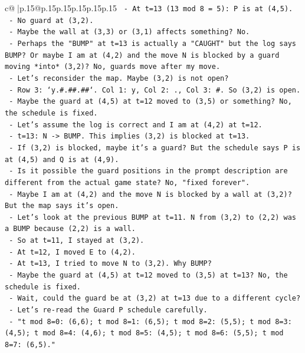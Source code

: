 \documentclass{article}
\begin{document}
{\begin{supertabular}{c@{$\;$}|p{.15\linewidth}@{}p{.15\linewidth}p{.15\linewidth}p{.15\linewidth}p{.15\linewidth}p{.15\linewidth}}
{{{\texttt{    {-} At t=13 (13 mod 8 = 5): P is at (4,5).} \\
\texttt{    {-} No guard at (3,2).} \\
\texttt{    {-} Maybe the wall at (3,3) or (3,1) affects something? No.} \\
\texttt{    {-} Perhaps the "BUMP" at t=13 is actually a "CAUGHT" but the log says BUMP? Or maybe I am at (4,2) and the move N is blocked by a guard moving *into* (3,2)? No, guards move after my move.} \\
\texttt{    {-} Let's reconsider the map. Maybe (3,2) is not open?} \\
\texttt{    {-} Row 3: `y.\#.\#\#.\#\#`. Col 1: y, Col 2: ., Col 3: \#. So (3,2) is open.} \\
\texttt{    {-} Maybe the guard at (4,5) at t=12 moved to (3,5) or something? No, the schedule is fixed.} \\
\texttt{    {-} Let's assume the log is correct and I am at (4,2) at t=12.} \\
\texttt{    {-} t=13: N {-}> BUMP. This implies (3,2) is blocked at t=13.} \\
\texttt{    {-} If (3,2) is blocked, maybe it's a guard? But the schedule says P is at (4,5) and Q is at (4,9).} \\
\texttt{    {-} Is it possible the guard positions in the prompt description are different from the actual game state? No, "fixed forever".} \\
\texttt{    {-} Maybe I am at (4,2) and the move N is blocked by a wall at (3,2)? But the map says it's open.} \\
\texttt{    {-} Let's look at the previous BUMP at t=11. N from (3,2) to (2,2) was a BUMP because (2,2) is a wall.} \\
\texttt{    {-} So at t=11, I stayed at (3,2).} \\
\texttt{    {-} At t=12, I moved E to (4,2).} \\
\texttt{    {-} At t=13, I tried to move N to (3,2). Why BUMP?} \\
\texttt{    {-} Maybe the guard at (4,5) at t=12 moved to (3,5) at t=13? No, the schedule is fixed.} \\
\texttt{    {-} Wait, could the guard be at (3,2) at t=13 due to a different cycle?} \\
\texttt{    {-} Let's re{-}read the Guard P schedule carefully.} \\
\texttt{    {-} "t mod 8=0: (6,6); t mod 8=1: (6,5); t mod 8=2: (5,5); t mod 8=3: (4,5); t mod 8=4: (4,6); t mod 8=5: (4,5); t mod 8=6: (5,5); t mod 8=7: (6,5)."} \\
}}}
\end{supertabular}}
\end{document}
